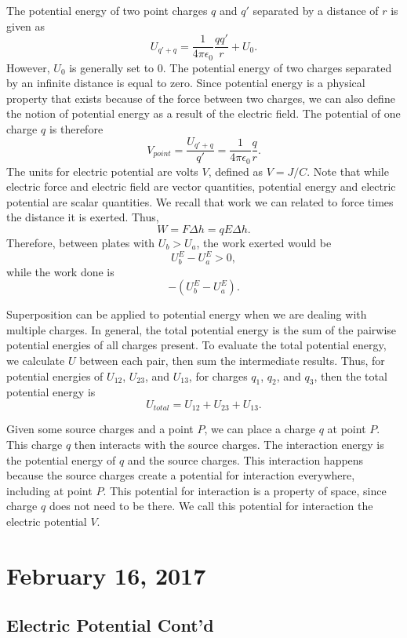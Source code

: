 \documentclass[11pt]{article}
\theoremstyle{plain} %
\theoremstyle{definition}
\theoremstyle{example}
\theoremstyle{remark}
\begin{document}
The potential energy of two point charges $q$ and $q'$ separated by a distance of $r$ is given as
$$U_{q'+q} = \frac{1}{4\pi\epsilon_0}\frac{qq'}{r}+U_0.$$
However, $U_0$ is generally set to $0$. The potential energy of two charges separated by an infinite distance is equal to zero. Since potential energy is a physical property that exists because of the force between two charges, we can also define the notion of potential energy as a result of the electric field. The potential of one charge $q$ is therefore
$$V_{point} = \frac{U_{q'+q} }{q'} = \frac{1}{4\pi\epsilon_0}\frac{q}{r}.$$
The units for electric potential are volts $V$, defined as 
$V = J/C$. Note that while electric force and electric field are vector quantities, potential energy and electric potential are scalar quantities. We recall that work we can related to force times the distance it is exerted. Thus, 
$$W = F\Delta h = qE\Delta h.$$
Therefore, between plates with $U_b > U_a$, the work exerted would be 
$$U_b^E - U_a^E > 0,$$
while the work done is 
$$-\left(U_b^E-U_a^E\right).$$

Superposition can be applied to potential energy when we are dealing with multiple charges. In general, the total potential energy is the sum of the pairwise potential energies of all charges present. To evaluate the total potential energy, we calculate $U$ between each pair, then sum the intermediate results. Thus, for potential energies of $U_{12}$, $U_{23}$, and $U_13$, for charges $q_1$, $q_2$, and $q_3$, then the total potential energy is 
$$U_{total} = U_{12} + U_{23} + U_{13}.$$

Given some source charges and a point $P$, we can place a charge $q$ at point $P$. This charge $q$ then interacts with the source charges. The interaction energy is the potential energy of $q$ and the source charges. This interaction happens because the source charges create a potential for interaction everywhere, including at point $P$. This potential for interaction is a property of space, since charge $q$ does not need to be there. We call this potential for interaction the electric potential $V$. 



\section{February 16, 2017}
\subsection{Electric Potential Cont'd}
\end{document}
